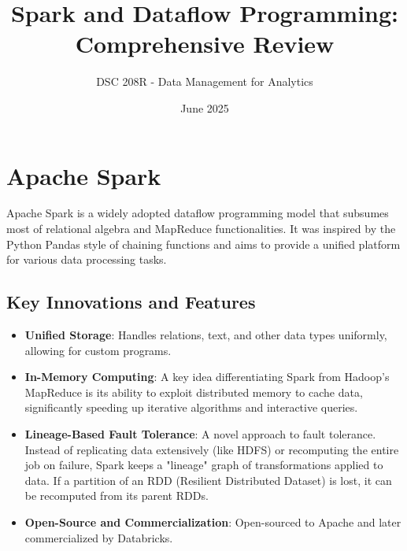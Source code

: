 \documentclass{article}
\title{Spark and Dataflow Programming: Comprehensive Review}
\author{DSC 208R - Data Management for Analytics}
\date{June 2025}
\begin{document}
\maketitle

\section*{Apache Spark}
Apache Spark is a widely adopted dataflow programming model that subsumes most of relational algebra and MapReduce functionalities. It was inspired by the Python Pandas style of chaining functions and aims to provide a unified platform for various data processing tasks.

\subsection*{Key Innovations and Features}
\begin{itemize}
    \item \textbf{Unified Storage}: Handles relations, text, and other data types uniformly, allowing for custom programs.
    \item \textbf{In-Memory Computing}: A key idea differentiating Spark from Hadoop's MapReduce is its ability to exploit distributed memory to cache data, significantly speeding up iterative algorithms and interactive queries.
    \item \textbf{Lineage-Based Fault Tolerance}: A novel approach to fault tolerance. Instead of replicating data extensively (like HDFS) or recomputing the entire job on failure, Spark keeps a "lineage" graph of transformations applied to data. If a partition of an RDD (Resilient Distributed Dataset) is lost, it can be recomputed from its parent RDDs.
    \item \textbf{Open-Source and Commercialization}: Open-sourced to Apache and later commercialized by Databricks.
\end{itemize}
\end{document}
